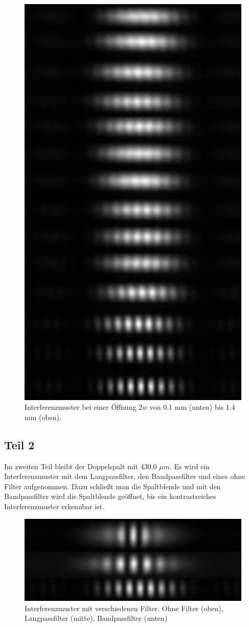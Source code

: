 \documentclass[12pt,a4paper,twoside]{article}
\begin{document}
\begin{figure}[H]
    \centering
    \includegraphics[width=0.6\linewidth]{nudes/aufgabe 1.jpg}
    \caption{Interferenzmuster bei einer Öffnung $2w$ von 0.1 mm (unten) bis 1.4 mm (oben). }
    \label{fig:aufgabe 1}
\end{figure}

\subsection{Teil 2}
Im zweiten Teil bleibt der Doppelspalt mit 430.0 $\mu m$. Es wird ein Interferenzmuster mit dem Langpassfilter, den Bandpassfilter und eines ohne Filter aufgenommen. 
Dazu schließt man die Spaltblende und mit den Bandpassfilter wird die Spaltblende geöffnet, bis ein kontrastreiches Interferenzmuster erkennbar ist. 

\begin{figure}[H]
    \centering
    \includegraphics[width=0.6\linewidth]{nudes/aufgabe 2.jpg}
    \caption{Interferenzmuster mit verschiedenen Filter. Ohne Filter (oben), Langpassfilter (mitte), Bandpassfilter (unten) }
    \label{fig:aufgabe 2}
\end{figure}
\end{document}
